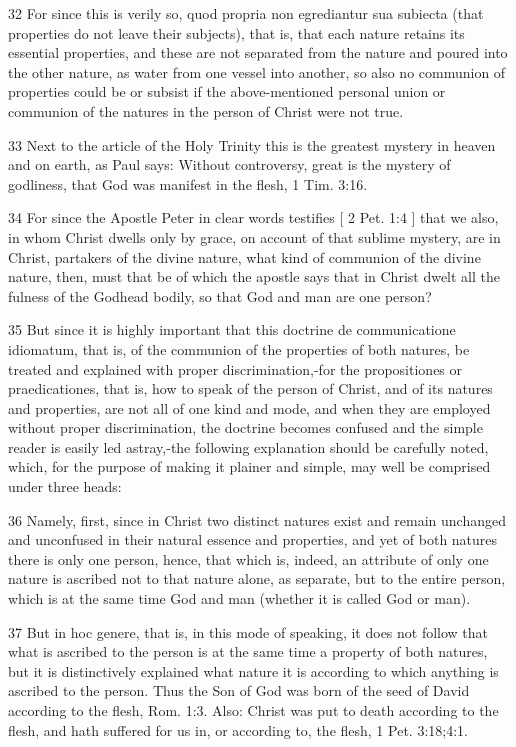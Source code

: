 {32 For since this is verily so, quod propria non egrediantur sua subiecta (that properties do not leave their subjects), that is, that each nature retains its essential properties, and these are not separated from the nature and poured into the other nature, as water from one vessel into another, so also no communion of properties could be or subsist if the above-mentioned personal union or communion of the natures in the person of Christ were not true.

33 Next to the article of the Holy Trinity this is the greatest mystery in heaven and on earth, as Paul says: Without controversy, great is the mystery of godliness, that God was manifest in the flesh, 1 Tim. 3:16.

34 For since the Apostle Peter in clear words testifies [ 2 Pet. 1:4 ] that we also, in whom Christ dwells only by grace, on account of that sublime mystery, are in Christ, partakers of the divine nature, what kind of communion of the divine nature, then, must that be of which the apostle says that in Christ dwelt all the fulness of the Godhead bodily, so that God and man are one person?

35 But since it is highly important that this doctrine de communicatione idiomatum, that is, of the communion of the properties of both natures, be treated and explained with proper discrimination,-for the propositiones or praedicationes, that is, how to speak of the person of Christ, and of its natures and properties, are not all of one kind and mode, and when they are employed without proper discrimination, the doctrine becomes confused and the simple reader is easily led astray,-the following explanation should be carefully noted, which, for the purpose of making it plainer and simple, may well be comprised under three heads:

36 Namely, first, since in Christ two distinct natures exist and remain unchanged and unconfused in their natural essence and properties, and yet of both natures there is only one person, hence, that which is, indeed, an attribute of only one nature is ascribed not to that nature alone, as separate, but to the entire person, which is at the same time God and man (whether it is called God or man).

37 But in hoc genere, that is, in this mode of speaking, it does not follow that what is ascribed to the person is at the same time a property of both natures, but it is distinctively explained what nature it is according to which anything is ascribed to the person. Thus the Son of God was born of the seed of David according to the flesh, Rom. 1:3. Also: Christ was put to death according to the flesh, and hath suffered for us in, or according to, the flesh, 1 Pet. 3:18;4:1.

}
